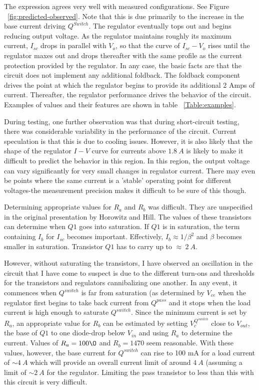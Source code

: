 \documentclass{article}
\begin{document}
The expression agrees very well with measured configurations. 
See Figure ~\ref{fig:predicted-observed}.
Note that this is due primarily to the increase in the base current driving 
$Q^{Switch}$. The regulator eventually tops out and begins reducing 
output voltage. 
As the regulator maintains roughly its maximum current, $I_{sc}$ drops 
in parallel with $V_o$, so that the curve of $I_{sc}-V_o$ rises 
until the regulator maxes out and drops thereafter 
with the same profile as the current protection provided by the regulator.
In any case, the basic facts are that the circuit does not implement 
any additional foldback. 
The foldback component drives the point at which the regulator 
begins to provide its additional 2 Amps of current. 
Thereafter, the regulator performance drives the behavior of the circuit. 
Examples of values and their features are shown in table ~\ref{Table:examples}.

During testing, one further observation was that during short-circuit 
testing, there was considerable variability in the performance of the circuit. 
Current speculation is that this is due to cooling issues. 
However, it is also likely that the shape of the regulator $I-V$ 
curve for currents above $1.8 \ A$ is likely to make it difficult to
 predict the behavior in this region. In this region, the output 
voltage can vary significantly for very small changes in regulator current. 
There may even be points where the same current is a 'stable' 
operating point for different voltages-the measurement precision 
makes it difficult to be sure of this though.

Determining appropriate values for
 $R_a$ and $R_b$ was difficult. They are unspecified in
the original presentation by Horowitz and Hill.
The values of these transistors can determine
when $Q1$ goes into saturation. 
If $Q1$ is in saturation, the term containing $I_b$ for $I_{sc}$ 
becomes important. Effectively, $I_b \approx 1/\beta ^2$ and $\beta$ becomes 
smaller in saturation. Transistor $Q1$ has to carry 
up to $\approx \ 2 \ A$. 

However, without saturating the transistors, 
I have observed an oscillation in the circuit that I have come to 
suspect is due to the different turn-ons and thresholds for the transistors 
and regulators cannibalizing one another. 
In any event, it commences when $Q^{switch}$ is far 
from saturation (as determined by $V_{ce}$ when the regulator 
first begins to take back current from $Q^{pass}$ and 
it stops when the load current is high enough to saturate $Q^{switch}$. 
Since the minimum current is set by $R_a$, an appropriate value 
for $R_b$ can be estimated by setting $V_c^{Q^{switch}}$ close to $V_{out}$, 
the base of $Q1$ to one diode-drop below $V_{in}$ and using 
$R_a$ to determine the current. Values of $R_a = 100 \O$ and $R_b=1470$ 
seem reasonable. With these values, however, the base 
current for $Q^{switch}$ can rise to 100 mA for a 
load current of $\sim 4 \ A$ which will provide an overall 
current limit of around $4 \ A$ (assuming a limit of $\sim 2 \ A$ 
for the regulator. 
Limiting the pass transistor to less than this with this circuit is 
very difficult.
\end{document}
